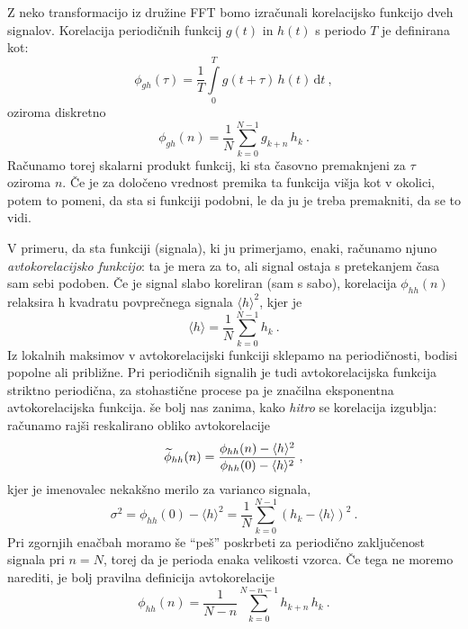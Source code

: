 \documentclass[a4paper, 12pt, slovene]{article}
\newcommand{\dd}{\,\mathrm{d}}
\begin{document}
Z neko transformacijo iz družine FFT bomo izračunali korelacijsko
funkcijo dveh signalov. Korelacija periodičnih funk\-cij $g(t)$ in $h(t)$
s periodo $T$ je definirana kot:
\begin{equation*}
\phi_{gh}(\tau)=\frac{1}{T}\int\limits_0^{T} g(t+\tau)\,h(t)\dd t \>,  
\end{equation*}
oziroma diskretno
\begin{equation*}
  \phi_{gh}(n)= \frac{1}{N}\sum_{k=0}^{N-1} g_{k+n}\, h_k \>.
\end{equation*}
Računamo torej skalarni produkt funkcij, ki sta časovno premaknjeni
za $\tau$ oziroma $n$. Če je za določeno vrednost premika ta
funkcija višja kot v okolici, potem to pomeni, da sta si funkciji
podobni, le da ju je treba premakniti, da se to vidi.

V primeru, da sta funkciji (signala), ki ju primerjamo, enaki,
računamo njuno {\sl avtokorelacijsko funkcijo\/}: ta je mera
za to, ali signal ostaja s pretekanjem časa sam sebi podoben.
Če je signal slabo koreliran (sam s sabo), korelacija $\phi_{hh}(n)$
relaksira h kvadratu povprečnega signala $\langle h\rangle^2$, kjer je
\begin{equation*}
\langle h\rangle = \frac{1}{N} \sum_{k=0}^{N-1} h_k \>.  
\end{equation*}
Iz lokalnih maksimov v avtokorelacijski funkciji sklepamo
na periodičnosti, bodisi popolne ali približne.
Pri periodičnih signalih je tudi avtokorelacijska funkcija
striktno periodična, za stohastične procese pa je značilna
eksponentna avtokorelacijska funkcija.
še bolj nas zanima, kako {\sl hitro\/} se korelacija izgublja:
računamo rajši reskalirano obliko avtokorelacije
\begin{equation*}
\widetilde{\phi}_{hh}(n) = 
{ \phi_{hh}(n) - \langle h\rangle^2 \over \phi_{hh}(0) - \langle h\rangle^2 } \>,  
\end{equation*}
kjer je imenovalec nekakšno merilo za  varianco signala,
\begin{equation*}
\sigma^2 = \phi_{hh}(0) - \langle h\rangle^2 
= \frac{1}{N} \sum_{k=0}^{N-1} \left( h_k - \langle h\rangle \right)^2 \>.  
\end{equation*}
Pri zgornjih enačbah moramo še ``peš'' poskrbeti za periodično
zaključenost signala pri $n=N$, torej da je perioda enaka velikosti
vzorca.  Če tega ne moremo narediti, je bolj pravilna definicija
avtokorelacije
\begin{equation*}
\phi_{hh}(n)= \frac{1}{N-n}\sum_{k=0}^{N-n-1} h_{k+n}\, h_k \>.  
\end{equation*}
\end{document}
